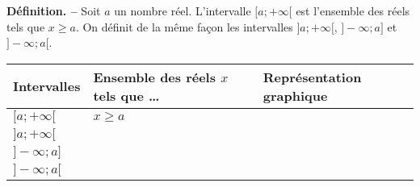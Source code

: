 \documentclass[handout]{beamer}
\begin{document}
\begin{frame}
  \textbf{Définition. --} Soit $a$ un nombre réel. L'intervalle $[a;+\infty[$ est l'ensemble des réels tels que $x\geq a$. On définit de la même façon les intervalles $]a;+\infty[$, $]-\infty;a]$ et $]-\infty;a[$.

  \begin{center}
    \renewcommand{\arraystretch}{1.2}
    \begin{tabular}{|>{\centering}m{2cm}|>{\centering}m{4cm}|>{\centering}m{4cm}|}
      \hline
      \textbf{Intervalles} & \textbf{Ensemble des réels $x$ tels que \dots} & \textbf{Représentation graphique}\tabularnewline
      \hline
      $[a;+\infty[$ & $x\geq a$ & \tabularnewline
      \hline
      $]a;+\infty[$ & & \tabularnewline
      \hline
      $]-\infty;a]$ & & \tabularnewline
      \hline
      $]-\infty;a[$ & & \tabularnewline
      \hline
    \end{tabular}
  \end{center}
\end{frame}
\end{document}
